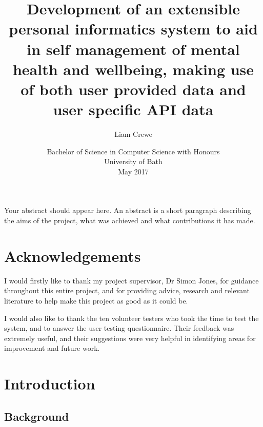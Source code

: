 \documentclass[11pt,openright,a4paper]{report}
\title{Development of an extensible personal informatics system to aid in self management of mental health and wellbeing, making use of both user provided data and user specific API data}
\author{Liam Crewe}
\date{Bachelor of Science in Computer Science with Honours\\University of Bath\\May 2017}
\begin{document}
\lstset{language=Java,breaklines,breakatwhitespace,basicstyle=\small}

\setcounter{page}{0}

\maketitle
\newpage


\newpage


\newpage


\abstract
Your abstract should appear here.  An abstract is a short
paragraph describing the aims of the project, what was
achieved and what contributions it has made.
\newpage


\tableofcontents
\newpage
\listoffigures
\newpage
\listoftables
\newpage


\chapter*{Acknowledgements}
I would firstly like to thank my project supervisor, Dr Simon Jones, for guidance throughout this entire project, and for providing advice, research and relevant literature to help make this project as good as it could be.

I would also like to thank the ten volunteer testers who took the time to test the system, and to answer the user testing questionnaire. Their feedback was extremely useful, and their suggestions were very helpful in identifying areas for improvement and future work.

\newpage
\setcounter{page}{1}

\chapter{Introduction}
\section{Background}
\end{document}
